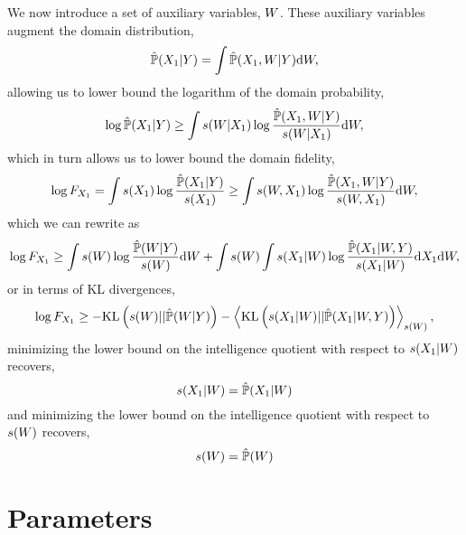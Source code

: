 \documentclass[]{article}
\begin{document}
We now introduce a set of auxiliary variables, $W$. These auxiliary variables augment the domain distribution,
\[
\hat{\mathbb{P}}({X_1} | Y) = \int \hat{\mathbb{P}}({X_1}, W | Y) \text{d} W,
\]
allowing us to lower bound the logarithm of the domain probability,
\[
\log \hat{\mathbb{P}}({X_1} | Y) \geq \int s(W|{X_1}) \log \frac{\hat{\mathbb{P}}({X_1}, W | Y)}{s(W|{X_1})} \text{d}W,
\]
which in turn allows us to lower bound the domain fidelity, 
\[
\log F_{X_1} = \int s({X_1}) \log \frac{\hat{\mathbb{P}}({X_1} | Y)}{s({X_1})} \geq \int s(W,{X_1}) \log \frac{\hat{\mathbb{P}}({X_1}, W | Y)}{s(W,{X_1})} \text{d}W,
\]
which we can rewrite as
\[
\log F_{X_1} \geq \int s(W) \log \frac{\hat{\mathbb{P}}(W|Y)}{s(W)}\text{d} W + \int s(W) \int s({X_1}|W) \log \frac{\hat{\mathbb{P}}({X_1}|W, Y)}{s({X_1}|W)} \text{d} {X_1} \text{d}W,
\]
or in terms of KL divergences,
\[
\log F_{X_1} \geq -\text{KL}\left(s(W)|| \hat{\mathbb{P}}(W|Y)\right) - \left\langle  \text{KL}\left(s({X_1}|W) || \hat{\mathbb{P}}({X_1}|W, Y) \right) \right\rangle_{ s(W)} ,
\]
minimizing the lower bound on the intelligence quotient with respect to $s({X_1} | W)$ recovers,
$$
s({X_1} | W) = \hat{\mathbb{P}}({X_1} | W)
$$
and minimizing the lower bound on the intelligence quotient with respect to $s(W)$ recovers,
$$
s(W) = \hat{\mathbb{P}}(W)
$$

\section{Parameters}
\end{document}
